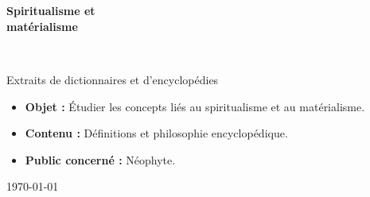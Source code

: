 \begin{titlepage}
%
~\\[1cm]

\begin{center}
\end{center}

\textsc{\Large }\\[0.5cm]

\HRule

\begin{center}
{\huge \bfseries Spiritualisme et\\
matérialisme\\[0.4cm] }
\end{center}

\HRule \\[1.5cm]


\vfill

\hfill
\begin{minipage}{0.4\textwidth}
\begin{flushright} \large
Extraits de dictionnaires et d'encyclopédies
\end{flushright}
\end{minipage}

\vfill
{\sf \footnotesize
\begin{itemize}[leftmargin=1cm, label=, itemsep=1pt]
\item {\bf Objet : } Étudier les concepts liés au spiritualisme et au matérialisme.
\item {\bf Contenu : } Définitions et philosophie encyclopédique.
\item {\bf Public concerné : } Néophyte.
\end{itemize}
}

\vfill

{\large \today}

\end{titlepage}
